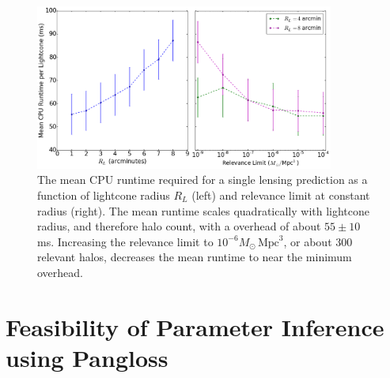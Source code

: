 \documentclass[%
 reprint,
 amsmath,amssymb,
 aps,nofootinbib
]{revtex4-1}
\begin{document}
\begin{figure}
    \centering
    \includegraphics[width=0.875\textwidth]{figs-swe/thesis/cpu_scaling.png}
    \captionsetup{justification=raggedright,singlelinecheck=false}
    \caption{The mean CPU runtime required for a single lensing prediction as a function of lightcone radius $R_L$ (left) and relevance limit at constant radius (right). The mean runtime scales quadratically with lightcone radius, and therefore halo count, with a overhead of about ${55\pm10}$ ms. Increasing the relevance limit to ${10^{-6}M_\odot\,\text{Mpc}^3}$, or about 300 relevant halos, decreases the mean runtime to near the minimum overhead.}
    \label{fig:cpu_scaling}
\end{figure}
%

\section{Feasibility of Parameter Inference using Pangloss} \label{feasibility}
\end{document}
